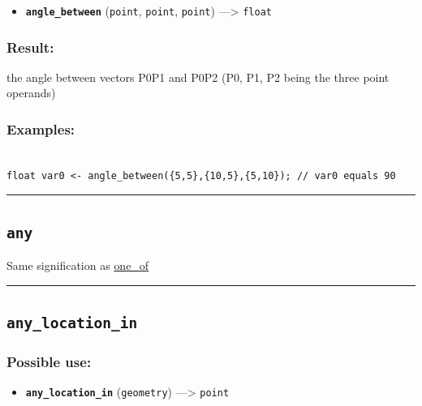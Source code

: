 \documentclass[]{book}
\providecommand{\tightlist}{%
  \setlength{\itemsep}{0pt}\setlength{\parskip}{0pt}}
\theoremstyle{definition}
\theoremstyle{definition}
\theoremstyle{definition}
\theoremstyle{remark}
\begin{document}
\begin{itemize}
\tightlist
\item
  \textbf{\texttt{angle\_between}} (\texttt{point}, \texttt{point},
  \texttt{point}) ---\textgreater{} \texttt{float}
\end{itemize}

\subsubsection{Result:}\label{result-36}

the angle between vectors P0P1 and P0P2 (P0, P1, P2 being the three
point operands)

\subsubsection{Examples:}\label{examples-29}

\begin{verbatim}
 
float var0 <- angle_between({5,5},{10,5},{5,10}); // var0 equals 90
\end{verbatim}

\begin{center}\rule{0.5\linewidth}{\linethickness}\end{center}

\subsection{\texorpdfstring{\texttt{any}}{any}}\label{any}

Same signification as \href{operators-n-to-r.html\#one_of}{one\_of}

\begin{center}\rule{0.5\linewidth}{\linethickness}\end{center}

\subsection{\texorpdfstring{\texttt{any\_location\_in}}{any\_location\_in}}\label{any_location_in}

\subsubsection{Possible use:}\label{possible-use-38}

\begin{itemize}
\tightlist
\item
  \textbf{\texttt{any\_location\_in}} (\texttt{geometry})
  ---\textgreater{} \texttt{point}
\end{itemize}
\end{document}
